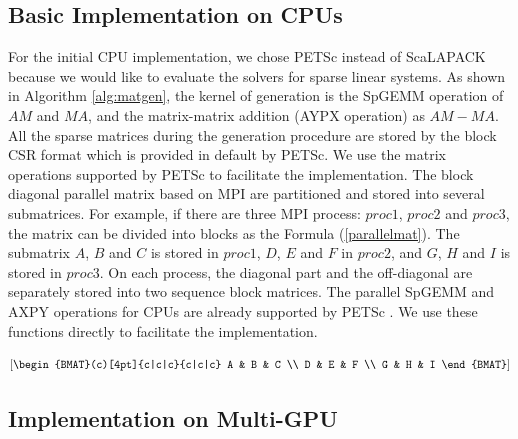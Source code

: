\subsection{Basic Implementation on CPUs}

For the initial CPU implementation, we chose PETSc instead of ScaLAPACK because we would like to evaluate the solvers for sparse linear systems. As shown in Algorithm \ref{alg:matgen}, the kernel of generation is the SpGEMM operation of $AM$ and $MA$, and the matrix-matrix addition (AYPX operation) as $AM-MA$. All the sparse matrices during the generation procedure are stored by the block CSR format which is provided in default by PETSc. We use the matrix operations supported by PETSc to facilitate the implementation. The block diagonal parallel matrix based on MPI are partitioned and stored into several submatrices. For example, if there are three MPI process: $proc1$, $proc2$ and $proc3$, the matrix can be divided into blocks as the Formula (\ref{parallelmat}). The submatrix $A$, $B$ and $C$ is stored in $proc1$,  $D$, $E$ and $F$ in $proc2$, and $G$, $H$ and $I$ is stored in $proc3$. On each process, the diagonal part and the off-diagonal are separately stored into two sequence block matrices. The parallel SpGEMM and AXPY operations for CPUs are already supported by PETSc \cite{balay2016petsc}. We use these functions directly to facilitate the implementation.


\begin{equation}
\label{parallelmat}
\left[
\begin{BMAT}(c)[4pt]{c|c|c}{c|c|c}
A  & B & C  \\
D & E & F  \\
G & H & I 
\end{BMAT}
\right]
\end{equation}


\subsection{Implementation on Multi-GPU}

